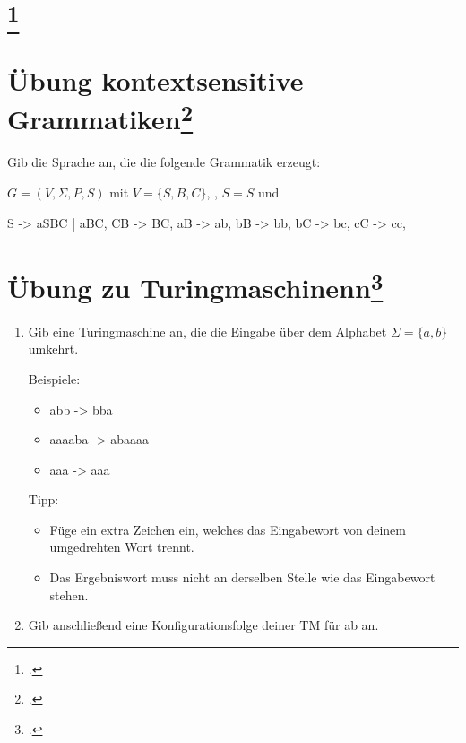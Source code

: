 \documentclass{lehramt-informatik-aufgabe}
\begin{document}
\section{
\footcite{theo:fs:3}}

\section{Übung kontextsensitive Grammatiken\footcite[Seite 8]{theo:fs:3}}

Gib die Sprache an, die die folgende Grammatik erzeugt:

$G = (V, \Sigma, P, S)$ mit
$V = \{S, B, C\}$, ,
$S=S$ und

\begin{liProduktionsRegeln}
S -> aSBC | aBC,
CB -> BC,
aB -> ab,
bB -> bb,
bC -> bc,
cC -> cc,
\end{liProduktionsRegeln}

%

\section{Übung zu Turingmaschinenn\footcite[Seite 24]{theo:fs:3}}

\begin{enumerate}
\item Gib eine Turingmaschine an, die die Eingabe über dem Alphabet
$\Sigma = \{ a, b \}$ umkehrt.

Beispiele:

\begin{itemize}
\item abb -> bba
\item aaaaba -> abaaaa
\item aaa -> aaa
\end{itemize}

Tipp:

\begin{itemize}
\item Füge ein extra Zeichen ein, welches das Eingabewort von deinem
umgedrehten Wort trennt.

\item Das Ergebniswort muss nicht an derselben Stelle wie das
Eingabewort stehen.
\end{itemize}

\item Gib anschließend eine Konfigurationsfolge deiner TM für ab an.

\end{enumerate}
\end{document}
